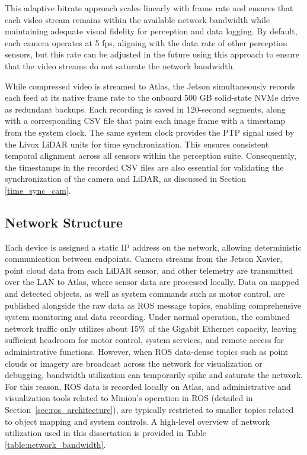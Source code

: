 \documentclass{erauthesis}
\begin{document}
This adaptive bitrate approach scales linearly with frame rate and ensures that each video stream remains within the available network bandwidth while maintaining adequate visual fidelity for perception and data logging.
By default, each camera operates at 5 \ac{fps}, aligning with the data rate of other perception sensors, but this rate can be adjusted in the future using this approach to ensure that the video streams do not saturate the network bandwidth. %

While compressed video is streamed to Atlas, the Jetson simultaneously records each feed at its native frame rate to the onboard 500 GB solid-state \ac{NVMe} drive as redundant backups. 
Each recording is saved in 120-second segments, along with a corresponding \ac{CSV} file that pairs each image frame with a timestamp from the system clock. 
The same system clock provides the \ac{PTP} signal used by the Livox LiDAR units for time synchronization.
This ensures consistent temporal alignment across all sensors within the perception suite. 
Consequently, the timestamps in the recorded \ac{CSV} files are also essential for validating the synchronization of the camera and LiDAR, as discussed in Section \ref{time_sync_cam}.

\subsection{Network Structure} \label{comp:network}

Each device is assigned a static IP address on the network, allowing deterministic communication between endpoints.
Camera streams from the Jetson Xavier, point cloud data from each LiDAR sensor, and other telemetry are transmitted over the \ac{LAN} to Atlas, where sensor data are processed locally.
Data on mapped and detected objects, as well as system commands such as motor control, are published alongside the raw data as \ac{ROS} message topics, enabling comprehensive system monitoring and data recording.
Under normal operation, the combined network traffic only utilizes about 15\% of the Gigabit Ethernet capacity, leaving sufficient headroom for motor control, system services, and remote access for administrative functions.
However, when \ac{ROS} data-dense topics such as point clouds or imagery are broadcast across the network for visualization or debugging, bandwidth utilization can temporarily spike and saturate the network.
For this reason, \ac{ROS} data is recorded locally on Atlas, and administrative and visualization tools related to Minion's operation in \ac{ROS} (detailed in Section~\ref{sec:ros_architecture}), are typically restricted to smaller topics related to object mapping and system controls.
A high-level overview of network utilization used in this dissertation is provided in Table \ref{table:network_bandwidth}.
\end{document}
